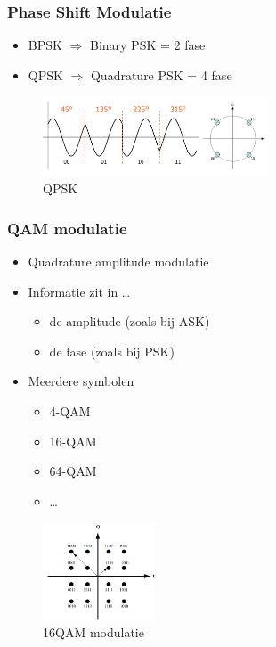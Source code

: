 \documentclass{article}
\begin{document}
\subsubsection{Phase Shift Modulatie}
\begin{itemize}
    \item BPSK $\Rightarrow$ Binary PSK = 2 fase
    \item QPSK $\Rightarrow$ Quadrature PSK = 4 fase
\end{itemize}

\begin{figure}[H]
    \centering
    \includegraphics[width=0.6\textwidth]{Screenshot_20200302_122452.png}
    \caption{QPSK}
\end{figure}

\subsubsection{QAM modulatie}
\begin{itemize}
    \item Quadrature amplitude modulatie
    \item Informatie zit in \dots
    \begin{itemize}
        \item de amplitude (zoals bij ASK)
        \item de fase (zoals bij PSK)
    \end{itemize}
    \item Meerdere symbolen
    \begin{itemize}
        \item 4-QAM
        \item 16-QAM
        \item 64-QAM
        \item \dots
    \end{itemize}
\end{itemize}

\begin{figure}[H]
    \centering
    \includegraphics[width=0.3\textwidth]{Screenshot_20200315_160021.png}
    \caption{16QAM modulatie}
\end{figure}
\end{document}
